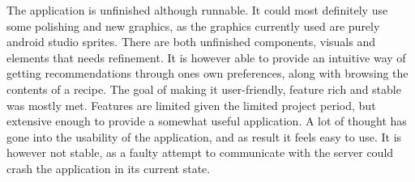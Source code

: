 The application is unfinished although runnable. It could most definitely use some polishing and new graphics, as the graphics currently used are purely android studio sprites. There are both unfinished components, visuals and elements that needs refinement. It is however able to provide an intuitive way of getting recommendations through ones own preferences, along with browsing the contents of a recipe. The goal of making it user-friendly, feature rich and stable was mostly met. Features are limited given the limited project period, but extensive enough to provide a somewhat useful application. A lot of thought has gone into the usability of the application, and as result it feels easy to use. It is however not stable, as a faulty attempt to communicate with the server could crash the application in its current state.




